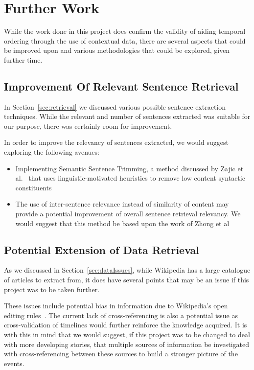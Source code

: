 \documentclass[bsc,frontabs,twoside,singlespacing,parskip,deptreport]{infthesis}     %
\begin{document}
\section{Further Work}
While the work done in this project does confirm the validity of aiding temporal ordering through the use of contextual
data, there are several aspects that could be improved upon and various methodologies that could be explored, given further
time.

\subsection{Improvement Of Relevant Sentence Retrieval}
In Section~\ref{sec:retrieval} we discussed various possible sentence extraction techniques.
While the relevant and number of sentences extracted was suitable for our purpose, there was certainly room for improvement.

In order to improve the relevancy of sentences extracted, we would suggest exploring the following avenues:
\begin{itemize}
\item Implementing Semantic Sentence Trimming, a method discussed by Zajic et al.~\cite{zajic2005sentence} that
  uses linguistic-motivated heuristics to remove low content syntactic constituents 

\item The use of inter-sentence relevance instead of similarity of content may provide a potential improvement of
  overall sentence retrieval relevancy. We would suggest that this method be based upon the work of Zhong et al~\cite{zhong2008practical}
\end{itemize}

\subsection{Potential Extension of Data Retrieval}
As we discussed in Section~\ref{sec:dataIssues}, while Wikipedia has a large catalogue of articles to extract from,
it does have several points that may be an issue if this project was to be taken further.

These issues include potential bias in information due to Wikipedia's open editing rules~\cite{wikipediaeditrules}. The current lack of
cross-referencing is also a potential issue as cross-validation of timelines would further reinforce the knowledge acquired.
It is with this in mind that we would suggest, if this project was to be changed to deal with more developing stories, that
multiple sources of information be investigated with cross-referencing between these sources to build a stronger picture of
the events.
\end{document}
